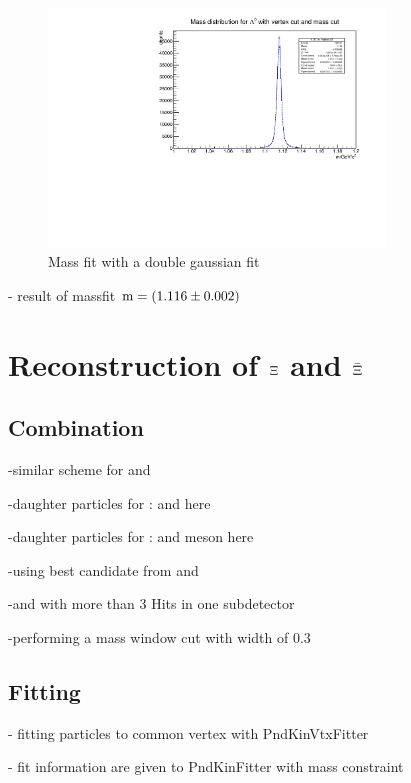 		\begin{figure}
			\centering
				\includegraphics[width=0.8\textwidth]{./plots/lambda0_m_masscut2.pdf}
			\caption{Mass fit with a double gaussian fit}
			\label{fig:lambda0_massfit}
		\end{figure}
		
		- result of massfit $\textnormal{m} = \left(1.116 \pm 0.002\right)$ \massunit
	
\section{Reconstruction of $\boldmath{\Xi}$ and $\boldmath{\bar{\Xi}}$}
	\subsection{Combination}
	
		-similar scheme for \lam and \alam
		
		-daughter particles for \anticascade: \antiproton and \piplus here \piplusone
		
		-daughter particles for \cascade:  \lam and \piminus meson here \piplusone
		
		-using best candidate from \lam and \alam
		
		-\piplus and \piminus with more than 3 Hits in one subdetector 
		
		-performing a mass window cut with width of $0.3$\massunit 
		
		
	\subsection{Fitting}
	
		- fitting particles to common vertex with PndKinVtxFitter
		
		- fit information are given to PndKinFitter with mass constraint
		
